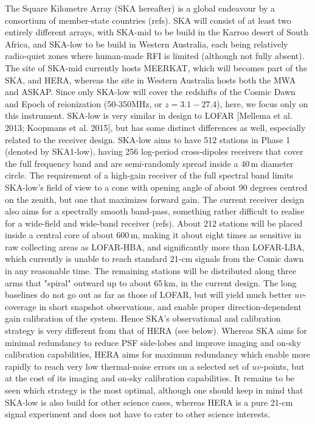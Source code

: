 The Square Kilometre Array (SKA hereafter) is a global endeavour by a consortium of member-state countries (refs). SKA will consist of at least two entirely different arrays, with SKA-mid to be build in the Karroo desert of South Africa, and SKA-low to be build in Western Australia, each being relatively radio-quiet zones where human-made RFI is limited (although not fully absent). The site of SKA-mid currently hosts MEERKAT, which will becomes part of the SKA, and HERA, whereas the site in Western Australia hosts both the MWA and ASKAP. Since only SKA-low will cover the redshifts of the Cosmic Dawn and Epoch of reionization (50-350MHz, or $z=3.1-27.4$), here, we focus only on this instrument. 
%
SKA-low is very similar in design to LOFAR [Mellema et al. 2013; Koopmans et al. 2015], but has some distinct differences as well, especially related to the receiver design. SKA-low aims to have 512 stations in Phase 1 (denoted by SKA1-low), having 256 log-period cross-dipoles receivers that cover the full frequency band and are semi-randomly spread inside a 40\,m diameter circle. The requirement of a high-gain receiver of the full spectral band limits SKA-low's field of view to a cone with opening angle of about 90 degrees centred on the zenith, but one that maximizes forward gain. The current receiver design also aims for a spectrally smooth band-pass, something rather difficult to realise for a wide-field and wide-band receiver (refs).
%
About 212 stations will be placed inside a central core of about 600\,m, making it about eight times as sensitive in raw collecting areas as LOFAR-HBA, and significantly more than LOFAR-LBA, which currently is unable to reach standard 21-cm signals from the Comic dawn in any reasonable time. The remaining stations will be distributed along three arms that "spiral" outward up to about 65\,km, in the current design. The long baselines do not go out as far as those of LOFAR, but will yield  much better $uv$-coverage in short snapshot observations, and enable proper direction-dependent gain calibration of the system. Hence SKA's observational and calibration strategy is very different from that of HERA (see below). Whereas SKA aims for minimal redundancy to reduce PSF side-lobes and improve imaging and on-sky calibration capabilities, HERA aims for maximum redundancy which enable more rapidly to reach very low thermal-noise errors on a selected set of $uv$-points, but at the cost of its imaging and on-sky calibration capabilities. It remains to be seen which strategy is the most optimal, although one should keep in mind that SKA-low is also build for other science cases, whereas HERA is a pure 21-cm signal experiment and does not have to cater to other science interests. 
